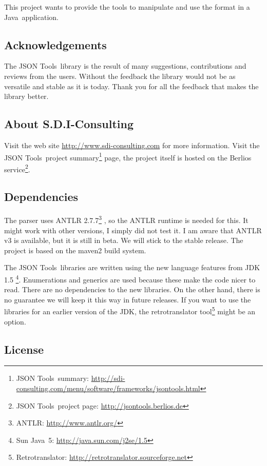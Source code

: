 \documentclass[a4paper]{article}
\newcommand{\jtools}{JSON Tools}
\newcommand{\java}{Java}
\begin{document}
This project wants to provide the tools to manipulate and use the format in a \java\ application. 

\subsection{Acknowledgements}
The \jtools\ library is the result of many suggestions, contributions and reviews from the users. Without the feedback the library would not be as versatile and stable as it is today. Thank you for all the feedback that makes the library better.

\subsection{About S.D.I-Consulting}

Visit the web site \url{http://www.sdi-consulting.com} for more information.
Visit the \jtools\ project summary\footnote{\jtools\ summary: \url{http://sdi-consulting.com/menu/software/frameworks/jsontools.html}} page, the project itself is hosted on the Berlios service\footnote{\jtools\  project page: \url{http://jsontools.berlios.de}}.

\subsection{Dependencies}

The parser uses ANTLR  2.7.7\footnote{ANTLR: \url{http://www.antlr.org/}} , so the ANTLR runtime is needed for this. It might work with other versions, I simply did not test it. I am aware that ANTLR v3 is available, but it is still in beta. We will stick to the stable release. The project is based on the maven2 build system.

The \jtools\ libraries are written using the new language features from JDK 1.5 \footnote{Sun \java\ 5: \url{http://java.sun.com/j2se/1.5}}.  Enumerations and generics are used because these make the code nicer to read.  There are no dependencies to the new libraries. On the other hand, there is no guarantee we will keep it this way in future releases. If you want to use the libraries for an earlier version of the JDK, the retrotranslator tool\footnote{Retrotranslator: \url{http://retrotranslator.sourceforge.net}} might be an option.

\subsection{License}
\end{document}
